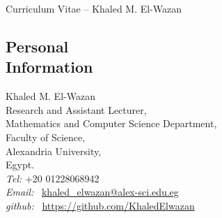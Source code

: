 \documentclass[margin,line,a4paper]{resume}
\begin{document}
{\sc \Large Curriculum Vitae -- Khaled M. El-Wazan}
\begin{resume}
    \vspace{0.5cm}
    


    \section{\mysidestyle Personal\\Information}%
    Khaled M. El-Wazan \\
    Research and Assistant Lecturer,\\
    Mathematics and Computer Science Department,\\
    Faculty of Science,  \\ 
    Alexandria University, \\ 
    Egypt. \\ 
    \emph{Tel:} +20 01228068942\\
    \emph{Email:} ~\href{mailto:khaled\_elwazan@ alex-sci.edu.eg}{khaled\_elwazan@alex-sci.edu.eg}\\
    \emph{github:} ~\href{https://github.com/KhaledElwazan}{https://github.com/KhaledElwazan}\\
    
    
    
    


\end{resume}
\end{document}
